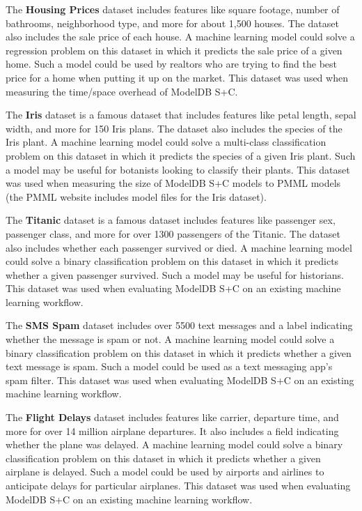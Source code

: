 The \textbf{Housing Prices} dataset \cite{housing} includes features like square
footage, number of bathrooms, neighborhood type, and more for about 1,500 houses.
The dataset also includes the sale price of each house. A machine learning model
could solve a regression problem on this dataset in which it predicts the sale
price of a given home. Such a model could be used by realtors who
are trying to find the best price for a home when putting it up on the market. This
dataset was used when measuring the time/space overhead of ModelDB S+C.

The \textbf{Iris} dataset \cite{iris} is a famous dataset that includes features
like petal length, sepal width, and more for 150 Iris plans. The dataset also
includes the species of the Iris plant. A machine learning model could solve a 
multi-class classification problem on this dataset in which it predicts the species
of a given Iris plant. Such a model may be useful for botanists looking to classify
their plants. This dataset was used when measuring the size of ModelDB S+C models
to PMML models (the PMML website includes model files for the Iris dataset).

The \textbf{Titanic} dataset \cite{titanic} is a famous dataset includes features like 
passenger sex, passenger class, and more for over 1300 passengers of the Titanic. 
The dataset also includes whether each passenger survived or died. A machine learning
model could solve a binary classification problem on this dataset in which it predicts whether
a given passenger survived. Such a model may be useful for historians. This dataset
was used when evaluating ModelDB S+C on an existing machine learning workflow.

The \textbf{SMS Spam} dataset \cite{spam} includes over 5500 text messages and
a label indicating whether the message is spam or not. A machine learning model
could solve a binary classification problem on this dataset in which it predicts
whether a given text message is spam. Such a model could be used as a text messaging
app's spam filter. This dataset was used when evaluating ModelDB S+C on an existing
machine learning workflow.

The \textbf{Flight Delays} dataset \cite{airline} includes features like carrier, departure
time, and more for over 14 million airplane departures. It also includes a field indicating whether
the plane was delayed. A machine learning model could solve a binary classification problem on this dataset in which
it predicts whether a given airplane is delayed. Such a model could be used by airports and airlines
to anticipate delays for particular airplanes. This dataset was used when evaluating ModelDB S+C
on an existing machine learning workflow.

